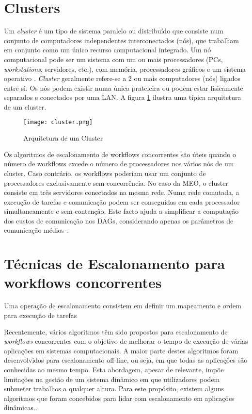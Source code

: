 \section{Clusters}
Um \textit{cluster} é um tipo de sistema paralelo ou distribuído que consiste num conjunto de computadores independentes interconectados (nós), que trabalham em conjunto como um único recurso computacional integrado. Um nó computacional pode ser um sistema com um ou mais processadores (PCs, \textit{workstations}, servidores, etc.), com memória, processadores gráficos e um sistema operativo \cite{Buyya1999}.
\textit{Cluster} geralmente refere-se a 2 ou mais computadores (nós) ligados entre si. Os nós podem existir numa única prateleira ou podem estar fisicamente separados e conectados por uma LAN.
A figura \ref{cluster} ilustra uma típica arquitetura de um cluster.

\begin{figure}[H]
	\centering
	\texttt{[image: cluster.png]}
	\caption{Arquitetura de um Cluster}
	\label{cluster}
\end{figure}

Os algoritmos de escalonamento de workflows concorrentes são úteis quando o número de workflows excede o número de processadores nos vários nós de um cluster. Caso contrário, os workflows poderiam usar um conjunto de processadores exclusivamente sem concorrência. 
No caso da MEO, o cluster consiste em três servidores conectados na mesma rede.
Numa rede comutada, a execução de tarefas e comunicação podem ser conseguidas em cada processador simultaneamente e sem contenção. Este facto ajuda a simplificar a computação dos custos de comunicação nos DAGs, considerando apenas os parâmetros de comunicação médios \cite{Arabnejad}.

\section{Técnicas de Escalonamento para workflows concorrentes}
Uma operação de escalonamento consistem em definir um mapeamento e ordem para execução de tarefas\cite{Arabnejad}

Recentemente, vários algoritmos têm sido propostos para escalonamento de \textit{workflows} concorrentes com o objetivo de melhorar o tempo de execução de várias aplicações em sistemas computacionais. A maior parte destes algoritmos foram desenvolvidos para escalonamento off-line, ou seja, em que todas as aplicações são conhecidas ao mesmo tempo. Esta abordagem, apesar de relevante, impõe limitações na gestão de um sistema dinâmico em que utilizadores podem submeter trabalhos a qualquer altura. Para este propósito, existem alguns algoritmos que foram concebidos para lidar com escalonamento em aplicações dinâmicas.\cite{Arabnejad}. 

